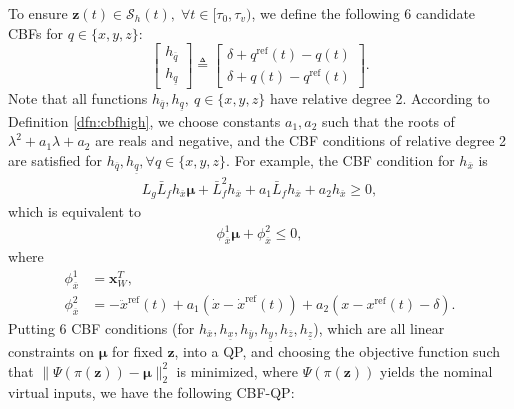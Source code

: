 \documentclass[journal,10pt]{IEEEtran}
\newcommand{\vect}[1]{\boldsymbol{\mathbf{#1}}}
\newcommand{\mat}[1]{\begin{bmatrix} #1 \end{bmatrix}}
\newcommand{\la}{\lambda}
\begin{document}
To ensure $\vect{z}(t)\in\mathcal{S}_h(t),\; \forall t\in[\tau_0,\tau_v)$, we define the following 6 candidate CBFs for $q\in\{x,y,z\}$:
\begin{equation} \label{CBF}
   \mat{h_{\overline{q}}\\h_{\underline{q}}} \triangleq\mat{\delta+ q^{\text{ref}}(t)-q(t)\\\delta+q(t)-q^{\text{ref}}(t)}.%
\end{equation}
Note that all functions $h_{\overline{q}},h_{\underline{q}},\ q\in\{x,y,z\}$ have relative degree 2. %
According to Definition \ref{dfn:cbfhigh}, we choose constants $a_1,a_2$ such that  the roots of $\la^2+a_1\la+a_2$ are reals and negative, and the CBF conditions of relative degree 2 are satisfied for $h_{\overline{q}},h_{\underline{q}},\forall q\in\{x,y,z\}$.  For example,  the CBF condition for $h_{\overline{x}}$ is
\begin{align*}
L_g\bar L_fh_{\overline{x}}\vect{\mu} +\bar L_f^2h_{\overline{x}}+a_1\bar L_fh_{\overline{x}}+a_2h_{\overline{x}} \geq 0,    
\end{align*}
which is equivalent to
\begin{align}\label{cbfx}
\phi_{\overline{x}}^1\vect{\mu}+\phi_{\overline{x}}^2\leq 0,
\end{align}
where
\begin{align*}
    \phi_{\overline{x}}^1&=\vect{x}_W^T,\\
    \phi_{\overline{x}}^2&=-\ddot{x}^{\text{ref}}(t) + a_1(\dot{x}-\dot{x}^{\text{ref}}(t))+a_2(x -x^{\text{ref}}(t)-\delta).
\end{align*}
Putting 6 CBF conditions (for $h_{\overline{x}},h_{\underline{x}},h_{\overline{y}},h_{\underline{y}},h_{\overline{z}},h_{\underline{z}}$), which are all linear constraints on $\vect{\mu}$ for fixed $\vect{z}$, into a QP, and choosing the objective function such that  $\|\Psi(\pi(\vect{z})) - \vect{\mu}\|_2^2$ is minimized, where $\Psi(\pi(\vect{z}))$ yields the nominal virtual inputs, we have the following CBF-QP:
\end{document}
